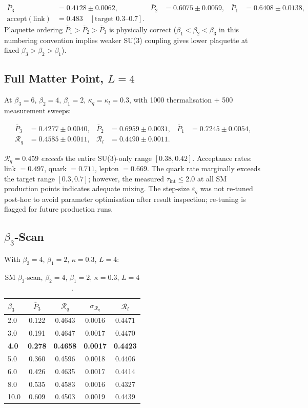 \documentclass[12pt,a4paper]{article}
\newcommand{\R}{\mathcal{R}}           %
\theoremstyle{plain}
\theoremstyle{definition}
\theoremstyle{remark}
\begin{document}
\begin{align*}
  \bar{P}_3 &= 0.4128 \pm 0.0062, &
  \bar{P}_2 &= 0.6075 \pm 0.0059, &
  \bar{P}_1 &= 0.6408 \pm 0.0138, \\
  \text{accept}(\text{link}) &= 0.483 \quad [\text{target } 0.3\text{--}0.7]. &&
\end{align*}
Plaquette ordering $\bar{P}_1>\bar{P}_2>\bar{P}_3$ is physically correct
($\beta_1<\beta_2<\beta_3$ in this numbering convention implies weaker SU(3) coupling
gives lower plaquette at fixed $\beta_3>\beta_2>\beta_1$).

\subsection{Full Matter Point, $L=4$}

At $\beta_3=6$, $\beta_2=4$, $\beta_1=2$, $\kappa_q=\kappa_l=0.3$,
with 1000 thermalisation + 500 measurement sweeps:

\begin{align*}
  \bar{P}_3 &= 0.4277\pm0.0040, &
  \bar{P}_2 &= 0.6959\pm0.0031, &
  \bar{P}_1 &= 0.7245\pm0.0054, \\
  \R_q &= 0.4585\pm0.0011, &
  \R_l &= 0.4490\pm0.0011. &
\end{align*}

$\R_q=0.459$ \emph{exceeds} the entire SU(3)-only range $[0.38,0.42]$.
Acceptance rates: link $=0.497$, quark $=0.711$, lepton $=0.669$.
The quark rate marginally exceeds the target range $[0.3,0.7]$; however,
the measured $\tau_\text{int}\le2.0$ at all SM production points indicates
adequate mixing. The step-size $\varepsilon_q$ was not re-tuned post-hoc
to avoid parameter optimisation after result inspection; re-tuning is
flagged for future production runs.

\subsection{$\beta_3$-Scan}

With $\beta_2=4$, $\beta_1=2$, $\kappa=0.3$, $L=4$:

\begin{table}[ht]
\centering
\caption{SM $\beta_3$-scan, $\beta_2=4$, $\beta_1=2$, $\kappa=0.3$, $L=4$.}
\label{tab:sm_bscan}
\begin{tabular}{lcccc}
\toprule
$\beta_3$ & $\bar{P}_3$ & $\R_q$ & $\sigma_{\R_q}$ & $\R_l$ \\
\midrule
 2.0 & 0.122 & 0.4643 & 0.0016 & 0.4471 \\
 3.0 & 0.191 & 0.4647 & 0.0017 & 0.4470 \\
\textbf{4.0} & \textbf{0.278} & \textbf{0.4658} & \textbf{0.0017} & \textbf{0.4423} \\
 5.0 & 0.360 & 0.4596 & 0.0018 & 0.4406 \\
 6.0 & 0.426 & 0.4635 & 0.0017 & 0.4414 \\
 8.0 & 0.535 & 0.4583 & 0.0016 & 0.4327 \\
10.0 & 0.609 & 0.4503 & 0.0019 & 0.4439 \\
\bottomrule
\end{tabular}
\end{table}
\end{document}
